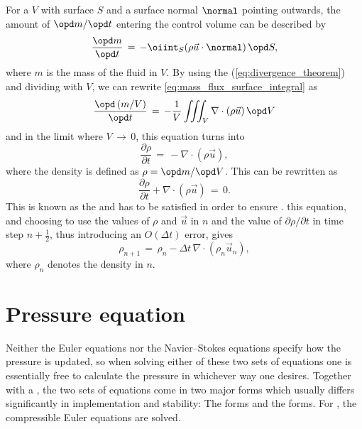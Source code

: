 For a  $V$ with surface $S$ and a surface normal $\normal$ pointing outwards, the amount of  $\opd m/\opd t$ entering the control volume can be described by
%
\begin{equation} \label{eq:mass_flux_surface_integral}
\frac{\opd m}{\opd t} \,=\, -\oiint_S(\rho\vec{u}\cdot\normal)\,\opd S,
\end{equation}
%
where $m$ is the mass of the fluid in $V$. By using the  (\eqref{eq:divergence_theorem}) and dividing with $V$, we can rewrite \eqref{eq:mass_flux_surface_integral} as
%
\begin{equation} \label{eq:mass_flux_volume_integral}
\frac{\opd\,(m/V)}{\opd t} \,=\, -\frac{1}{V}\iiint_V\nabla\cdot(\rho\vec{u})\,\opd V
\end{equation}
%
and in the limit where $V \,\rightarrow\, 0$, this equation turns into
%
\begin{equation} \label{eq:density_partial_time_derivative}
\frac{\partial \rho}{\partial t} \,=\, -\nabla\cdot(\rho\vec{u}),
\end{equation}
%
where the density is defined as $\rho = \opd m/\opd V$. This can be rewritten as
%
\begin{equation} \label{eq:continuity_equation}
\frac{\partial \rho}{\partial t} + \nabla\cdot(\rho\vec{u}) \,=\, 0.
\end{equation}
%
This is known as the  and has to be satisfied in order to ensure .  this equation, and choosing to use the values of $\rho$ and $\vec{u}$ in \timestep $n$ and the value of $\partial \rho/\partial t$ in time step $n+\frac{1}{2}$, thus introducing an $O(\Delta t)$ error, gives
%
\begin{equation} \label{eq:continuity_equation_time_discretized}
\rho_{n+1} \,=\, \rho_{n} - \Delta t\,\nabla\cdot(\rho_{n}\vec{u}_{n}),
\end{equation}
%
where $\rho_n$ denotes the density in \timestep $n$.

\section{Pressure equation}
\label{sec:pressure_calculation}

Neither the Euler equations nor the Navier--Stokes equations specify how the pressure is updated, so when solving either of these two sets of equations one is essentially free to calculate the pressure in whichever way one desires. Together with a , the two sets of equations come in two major forms which usually differs significantly in implementation and stability: The \compressible forms and the \incompressible forms. For \thisprojectwork, the compressible Euler equations are solved.

